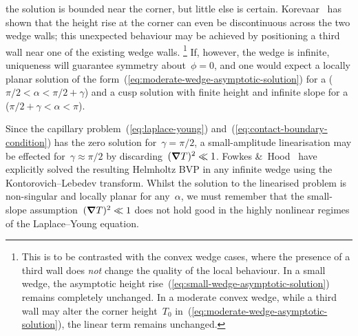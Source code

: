 \begin{enumerate}
    the solution is bounded near the corner,
    but little else is certain.
    Korevaar~\cite{korevaar-1980-capillary-re-entrant-corner}
    has shown that the height rise at the corner
    can even be discontinuous across the two wedge walls;
    this unexpected behaviour may be achieved
    by positioning a third wall near one of the existing wedge walls.%
    \footnote{
      This is to be contrasted with the convex wedge cases,
      where the presence of a third wall
      does \emph{not} change the quality of the local behaviour.
      In a small wedge,
      the asymptotic height rise~(\ref{eq:small-wedge-asymptotic-solution})
      remains completely unchanged.
      In a moderate convex wedge,
      while a third wall may alter the corner height~$T_0$
      in~(\ref{eq:moderate-wedge-asymptotic-solution}),
      the linear term remains unchanged.
    }
    If, however, the wedge is infinite,
    uniqueness will guarantee symmetry about~$\phi = 0$,
    and one would expect a locally planar solution
    of the form~(\ref{eq:moderate-wedge-asymptotic-solution})
    for a  ($\pi/2 < \alpha < \pi/2 + \gamma$)
    and a cusp solution with finite height and infinite slope
    for a  ($\pi/2 + \gamma < \alpha < \pi$).
\end{enumerate}
Since the capillary problem~(\ref{eq:laplace-young})
and~(\ref{eq:contact-boundary-condition})
has the zero solution for~$\gamma = \pi/2$,
a small-amplitude linearisation may be effected for~$\gamma \approx \pi/2$
by discarding~$(\mathop{}\!\boldsymbol{\mathbf{\nabla}} T)^2 \ll 1$.
Fowkes \&~Hood~\cite{fowkes-1998-surface-tension-effects-wedge}
have explicitly solved the resulting Helmholtz BVP
in any infinite wedge
using the Kontorovich--Lebedev transform.
Whilst the solution to the linearised problem is non-singular
and locally planar for any~$\alpha$,
we must remember that the small-slope assumption~$(\mathop{}\!\boldsymbol{\mathbf{\nabla}} T)^2 \ll 1$
does not hold good
in the highly nonlinear regimes of the Laplace--Young equation.

